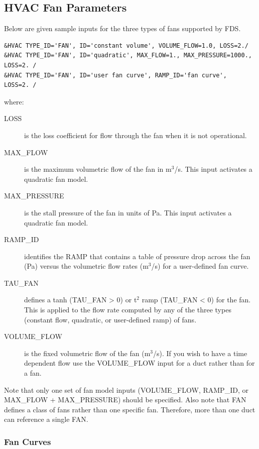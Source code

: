 \documentclass[11pt]{book}
\begin{document}
\subsection{HVAC Fan Parameters}
\label{info:HVACfan}

Below are given sample inputs for the three types of fans supported by FDS.

\begin{lstlisting}
&HVAC TYPE_ID='FAN', ID='constant volume', VOLUME_FLOW=1.0, LOSS=2./
&HVAC TYPE_ID='FAN', ID='quadratic', MAX_FLOW=1., MAX_PRESSURE=1000., LOSS=2. /
&HVAC TYPE_ID='FAN', ID='user fan curve', RAMP_ID='fan curve',  LOSS=2. /
\end{lstlisting}

\noindent where:

\begin{description}
\item[{\ct LOSS}] is the loss coefficient for flow through the fan when it is not operational.
\item[{\ct MAX\_FLOW}] is the maximum volumetric flow of the fan in m$^3$/s.  This input activates a quadratic fan model.
\item[{\ct MAX\_PRESSURE}] is the stall pressure of the fan in units of Pa.  This input activates a quadratic fan model.
\item[{\ct RAMP\_ID}] identifies the {\ct RAMP} that contains a table of pressure drop across the fan (Pa) versus the volumetric flow rates (m$^3$/s) for a user-defined fan curve.
\item[{\ct TAU\_FAN}] defines a tanh ({\ct TAU\_FAN} > 0) or t$^2$ ramp ({\ct TAU\_FAN} < 0) for the fan.  This is applied to the flow rate computed by any of the three types (constant flow, quadratic, or user-defined ramp) of fans.
\item[{\ct VOLUME\_FLOW}] is the fixed volumetric flow of the fan (m$^3$/s).  If you wish to have a time dependent flow use the {\ct VOLUME\_FLOW} input for a duct rather than for a fan.
\end{description}

\noindent
Note that only one set of fan model inputs ({\ct VOLUME\_FLOW}, {\ct RAMP\_ID}, or {\ct MAX\_FLOW + MAX\_PRESSURE}) should be specified.
Also note that {\ct FAN} defines a class of fans rather than one specific fan. Therefore, more than one duct can reference a single {\ct FAN}.

\subsubsection{Fan Curves}
\label{info:Fan_Curves}
\end{document}

